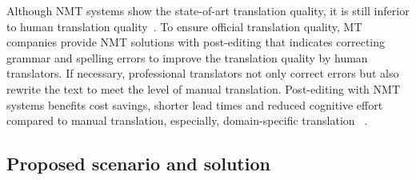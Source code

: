 Although NMT systems show the state-of-art translation quality, it is still inferior to human translation quality~\parencite{laubli-etal-2018-machine}. To ensure official translation quality, MT companies provide NMT solutions with post-editing that indicates correcting grammar and spelling errors to improve the translation quality by human translators. If necessary, professional translators not only correct errors but also rewrite the text to meet the level of manual translation. %
Post-editing with NMT systems benefits cost savings, shorter lead times and reduced cognitive effort compared to manual translation, especially, domain-specific translation
~\parencite{daems2017translation, jia2019does, laubli-etal-2019-post, toral2018post}. 

\subsection{Proposed scenario and solution}

